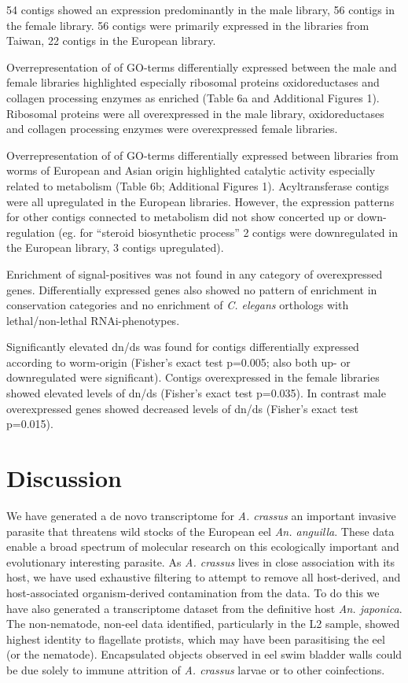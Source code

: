 \documentclass[10pt]{bmc_article}
\newenvironment{bmcformat}{\begin{raggedright}\baselineskip20pt\sloppy\setboolean{publ}{false}}{\end{raggedright}\baselineskip20pt\sloppy}
\begin{document}
\begin{bmcformat}
54 contigs
showed an expression predominantly in the male library,
56 contigs
in the female
library. 56
contigs were primarily expressed in the libraries from Taiwan,
22 contigs
in the European library.

Overrepresentation of of GO-terms differentially expressed between the
male and female libraries highlighted especially ribosomal proteins
oxidoreductases and collagen processing enzymes as enriched (Table 6a
and Additional Figures 1). Ribosomal proteins were all overexpressed
in the male library, oxidoreductases and collagen processing enzymes
were overexpressed female libraries.

Overrepresentation of of GO-terms differentially expressed between
libraries from worms of European and Asian origin highlighted catalytic
activity especially related to metabolism (Table 6b; Additional
Figures 1). Acyltransferase contigs were all upregulated in the
European libraries. However, the expression patterns for other contigs
connected to metabolism did not show concerted up or down-regulation
(eg. for ``steroid biosynthetic process'' 2 contigs were downregulated
in the European library, 3 contigs upregulated).

Enrichment of signal-positives was not found in any category of
overexpressed genes. Differentially expressed genes also showed no
pattern of enrichment in conservation categories and no enrichment of
\textit{C. elegans} orthologs with lethal/non-lethal RNAi-phenotypes.

Significantly elevated dn/ds was found for contigs differentially
expressed according to worm-origin (Fisher's exact test
p=0.005; also both up- or
downregulated were significant). Contigs overexpressed in the female
libraries showed elevated levels of dn/ds (Fisher's exact test
p=0.035). In contrast male
overexpressed genes showed decreased levels of dn/ds (Fisher's exact
test p=0.015).


\section*{Discussion}

We have generated a de novo transcriptome for \textit{A. crassus} an
important invasive parasite that threatens wild stocks of the European
eel \textit{An. anguilla}. These data enable a broad spectrum of
molecular research on this ecologically important and evolutionary
interesting parasite. As \textit{A. crassus} lives in close
association with its host, we have used exhaustive filtering to
attempt to remove all host-derived, and host-associated
organism-derived contamination from the data. To do this we have also
generated a transcriptome dataset from the definitive host
\textit{An. japonica}. The non-nematode, non-eel data identified,
particularly in the L2 sample, showed highest identity to flagellate
protists, which may have been parasitising the eel (or the
nematode). Encapsulated objects observed in eel swim bladder walls
\cite{heitlinger_massive_2009} could be due solely to immune attrition
of \textit{A. crassus} larvae or to other coinfections.


\end{bmcformat}
\end{document}

